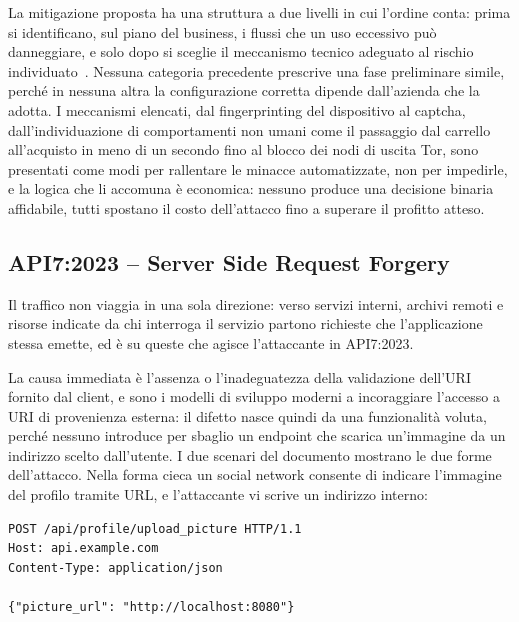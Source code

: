 La mitigazione proposta ha una struttura a due livelli in cui l'ordine conta:
prima si identificano, sul piano del business, i flussi che un uso eccessivo
può danneggiare, e solo dopo si sceglie il meccanismo tecnico adeguato al
rischio individuato~\cite{owasp2023api6}. Nessuna categoria precedente
prescrive una fase preliminare simile, perché in nessuna altra la
configurazione corretta dipende dall'azienda che la adotta. I meccanismi
elencati, dal fingerprinting del dispositivo al captcha, dall'individuazione di
comportamenti non umani come il passaggio dal carrello all'acquisto in meno di
un secondo fino al blocco dei nodi di uscita Tor, sono presentati come modi per
rallentare le minacce automatizzate, non per impedirle, e la logica che li
accomuna è economica: nessuno produce una decisione binaria affidabile, tutti
spostano il costo dell'attacco fino a superare il profitto atteso.

\subsection{API7:2023 -- Server Side Request Forgery}
\label{subsubsec:api7}

Il traffico non viaggia in una sola direzione: verso servizi interni, archivi
remoti e risorse indicate da chi interroga il servizio partono richieste che
l'applicazione stessa emette, ed è su queste che agisce l'attaccante in
API7:2023.

La causa immediata è l'assenza o l'inadeguatezza della validazione dell'URI
fornito dal client, e sono i modelli di sviluppo moderni a incoraggiare
l'accesso a URI di provenienza esterna: il difetto nasce quindi da una
funzionalità voluta, perché nessuno introduce per sbaglio un endpoint che
scarica un'immagine da un indirizzo scelto dall'utente. I due scenari del
documento mostrano le due forme dell'attacco. Nella forma cieca un social network consente di indicare
l'immagine del profilo tramite URL, e l'attaccante vi scrive un indirizzo
interno:

\begin{verbatim}
POST /api/profile/upload_picture HTTP/1.1
Host: api.example.com
Content-Type: application/json

{"picture_url": "http://localhost:8080"}
\end{verbatim}


